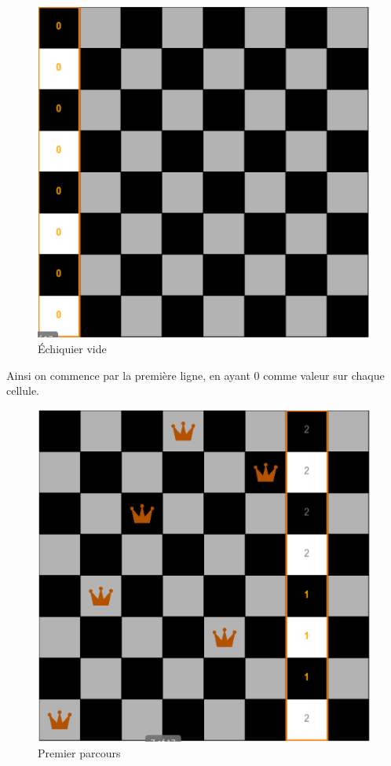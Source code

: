 \documentclass{article}
\begin{document}
\begin{figure}[!h]
	\caption{\label{local1} Échiquier vide}
	\begin{center}
	\includegraphics[scale=0.3]{./picture/local1.png}
	\end{center}
\end{figure}

Ainsi on commence par la première ligne, en ayant 0 comme valeur sur chaque cellule. 

\clearpage
\begin{figure}[!h]
	\caption{\label{local2} Premier parcours}
	\begin{center}
	\includegraphics[scale=0.3]{./picture/local2.png}
	\end{center}
\end{figure}
\end{document}
